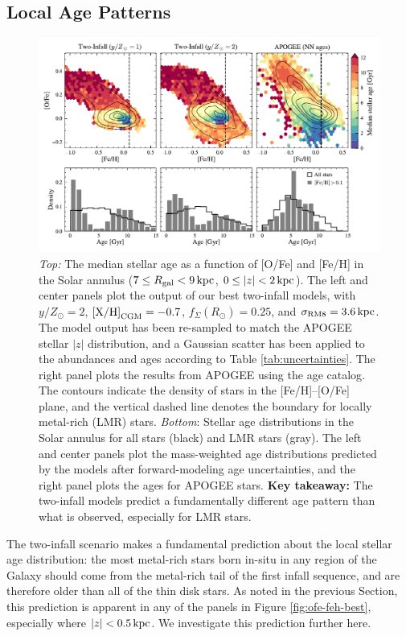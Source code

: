 \documentclass[twocolumn,twocolappendix,linenumbers]{aastex631}
\newcommand{\yZ}[1]{$y/Z_\odot=#1$}
\newcommand{\kpc}{\,{\rm kpc}}
\begin{document}
\subsection{Local Age Patterns}

\begin{figure}
    \centering
    \includegraphics[width=\textwidth]{figures/lmr_ages.pdf}
    \caption{{\it Top:} The median stellar age as a function of [O/Fe] and [Fe/H] in the Solar annulus ($7\leq R_{\rm gal}<9\kpc$, $0\leq|z|<2\kpc$). The left and center panels plot the output of our best two-infall models, with \yZ{2}, ${\rm [X/H]}_{\rm CGM}=-0.7$, $f_\Sigma(R_\odot)=0.25$, and $\sigma_{\rm RM8}=3.6\kpc$. The model output has been re-sampled to match the APOGEE stellar $|z|$ distribution, and a Gaussian scatter has been applied to the abundances and ages according to Table \ref{tab:uncertainties}. The right panel plots the results from APOGEE using the \citet{leung_variational_2023} age catalog. The contours indicate the density of stars in the [Fe/H]--[O/Fe] plane, and the vertical dashed line denotes the boundary for locally metal-rich (LMR) stars.
    {\it Bottom}: Stellar age distributions in the Solar annulus for all stars (black) and LMR stars (gray). The left and center panels plot the mass-weighted age distributions predicted by the models after forward-modeling age uncertainties, and the right panel plots the \citet{leung_variational_2023} ages for APOGEE stars.
    {\bf Key takeaway:} The two-infall models predict a fundamentally different age pattern than what is observed, especially for LMR stars.}
    \label{fig:lmr-ages}
\end{figure}

The two-infall scenario makes a fundamental prediction about the local stellar age distribution: the most metal-rich stars born in-situ in any region of the Galaxy should come from the metal-rich tail of the first infall sequence, and are therefore older than all of the thin disk stars. As noted in the previous Section, this prediction is apparent in any of the panels in Figure \ref{fig:ofe-feh-best}, especially where $|z|<0.5\kpc$. We investigate this prediction further here.
\end{document}
